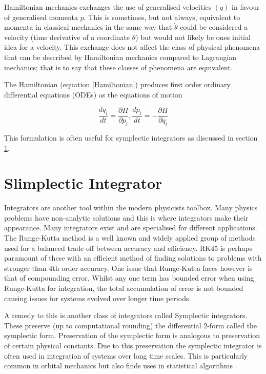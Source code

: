 \documentclass[10pt]{iopart}
\begin{document}
Hamiltonian mechanics exchanges the use of generalised velocities $(\dot q)$ in favour of generalised momenta $p$. This is sometimes, but not always, equivalent to momenta in classical mechanics in the same way that $\dot\theta$ could be considered a velocity (time derivative of a coordinate $\theta$) but would not likely be ones initial idea for a velocity. This exchange does not affect the class of physical phenomena that can be described by Hamiltonian mechanics compared to Lagrangian mechanics; that is to say that these classes of phenomena are equivalent.

The Hamiltonian (equation \ref{Hamiltonian}) produces first order ordinary differential equations (ODEs) as the equations of motion

\begin{equation}
	\frac{dq_i}{dt} = \frac{\partial H}{\partial p_i}, \frac{dp_i}{dt} = -\frac{\partial H}{\partial q_i}
\end{equation}

This formulation is often useful for symplectic integrators \cite{SanzSerna} as discussed in section \ref{Symplectic}.

\section{Slimplectic Integrator}
\label{Symplectic}
Integrators are another tool within the modern physicists toolbox. Many physics problems have non-analytic solutions and this is where integrators make their appearance. Many integrators exist and are specialised for different applications. The Runge-Kutta method \cite{RungeKutta} is a well known and widely applied group of methods used for a balanced trade off between accuracy and efficiency. RK45 is perhaps paramount of these with an efficient method of finding solutions to problems with stronger than 4th order accuracy. One issue that Runge-Kutta faces however is that of compounding error. Whilst any one term has bounded error when using Runge-Kutta for integration, the total accumulation of error is not bounded causing issues for systems evolved over longer time periods. 

A remedy to this is another class of integrators called Symplectic integrators. These preserve (up to computational rounding) the differential 2-form called the symplectic form. Preservation of the symplectic form is analogous to preservation of certain physical constants. Due to this preservation the symplectic integrator is often used in integration of systems over long time scales. This is particularly common in orbital mechanics \cite{WISDOM, ReinTamayo} but also finds uses in statistical algorithms \cite{Neal_MCMC}.
\end{document}
